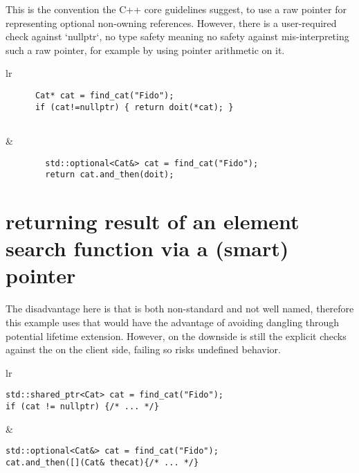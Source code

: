 \documentclass[a4paper,10pt,oneside,openany,final,article]{memoir}
\begin{document}
This is the convention the C++ core guidelines suggest, to use a raw pointer for representing optional non-owning references.
However, there is a user-required check against `nullptr`, no type safety meaning no safety against mis-interpreting such a raw pointer, for example by using pointer arithmetic on it.

\begin{tabular}{ lr }
  \begin{minipage}[t]{0.45\columnwidth}
    \begin{verbatim}
      Cat* cat = find_cat("Fido");
      if (cat!=nullptr) { return doit(*cat); }


    \end{verbatim}
  \end{minipage}
  &
    \begin{minipage}[t]{0.45\columnwidth}
      \begin{verbatim}
        std::optional<Cat&> cat = find_cat("Fido");
        return cat.and_then(doit);

      \end{verbatim}
    \end{minipage}
\end{tabular}

\section{returning result of an element search function via a (smart) pointer}

The disadvantage here is that  is both non-standard and not well named, therefore this example uses  that would have the advantage of avoiding dangling through potential lifetime extension.
However, on the downside is still the explicit checks against the  on the client side, failing so risks undefined behavior.

  \begin{tabular}{ lr }
  \begin{minipage}[t]{0.45\columnwidth}
    \begin{verbatim}
std::shared_ptr<Cat> cat = find_cat("Fido");
if (cat != nullptr) {/* ... */}

    \end{verbatim}
  \end{minipage}
  &
    \begin{minipage}[t]{0.45\columnwidth}
      \begin{verbatim}
std::optional<Cat&> cat = find_cat("Fido");
cat.and_then([](Cat& thecat){/* ... */}

      \end{verbatim}
    \end{minipage}
  \end{tabular}
\end{document}
